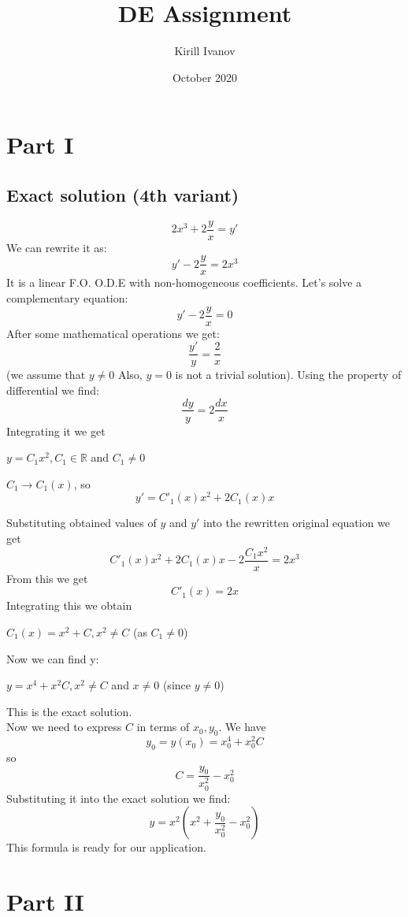 \documentclass{article}
\title{DE Assignment}
\author{Kirill Ivanov}
\date{October 2020}
\begin{document}
\maketitle

\section{Part I}
\subsection{Exact solution (4th variant)}
$$ 2x^3+2\frac{y}{x}=y' $$ We can rewrite it as:
$$ y'-2\frac{y}{x}=2x^3 $$ It is a linear F.O. O.D.E with non-homogeneous coefficients. Let’s solve a complementary equation:
$$ y'-2\frac{y}{x}=0 $$ After some mathematical operations we get:
$$ \frac{y'}{y}=\frac{2}{x} $$ (we assume that $ y \neq 0 $  Also, $ y = 0 $ is not a trivial solution). Using the property of differential we find: $$ \frac{dy}{y}=2\frac{dx}{x} $$
Integrating it we get \\ 
\begin{center}
    $ y = C_1 x^2, C_1 \in \mathbb{R} $ and $ C_1 \neq 0 $
\end{center} 

\begin{center}
    $ C_1 \rightarrow C_1(x) $, so $$ y' = C'_1(x)x^2 + 2C_1(x)x $$   
\end{center} 

Substituting obtained values of $ y $ and $ y' $ into the rewritten original equation we get
$$ C'_1(x)x^2 + 2C_1(x)x-2\frac{C_1 x^2}{x}=2x^3 $$ From this we get $$ C'_1(x) = 2x $$
Integrating this we obtain 
\begin{center}
$ C_1(x)=x^2+C, x^2 \neq C $ (as $ C_1 \neq 0 $) 
\end{center}
Now we can find y: 
\begin{center}$ y = x^4 + x^2C, x^2 \neq C $ and $ x \neq 0 $ (since $ y \neq 0 $)
\end{center}
This is the exact solution. \\
Now we need to express $ C $ in terms of $ x_0, y_0 $.
We have $$ y_0 = y(x_0) = x_0^4 + x_0^2 C $$ so  $$ C = \frac{y_0}{x_0^2}-x_0^2 $$
Substituting it into the exact solution we find: $$ y = x^2(x^2+\frac{y_0}{x_0^2}-x_0^2) $$ This formula is ready for our application.

\section {Part II}
\end{document}
